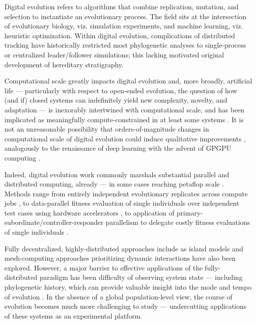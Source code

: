 Digital evolution refers to algorithms that combine replication, mutation, and selection to instantiate an evolutionary process.
The field sits at the intersection of evolutionary biology, viz. simulation experiments, and machine learning, viz. heuristic optimization.
Within digital evolution, complications of distributed tracking have historically restricted most phylogenetic analyses to single-process or centralized leader/follower simulations; this lacking motivated original development of hereditary stratigraphy.

Computational scale greatly impacts digital evolution and, more broadly, artificial life \citep{ackley2014indefinitely} --- particularly with respect to open-ended evolution, the question of how (and if) closed systems can indefinitely yield new complexity, novelty, and adaptation --- is inexorably intertwined with computational scale, and has been implicated as meaningfully compute-constrained in at least some systems \citep{taylor2016open,channon2019maximum}.
It is not an unreasonable possibility that orders-of-magnitude changes in computational scale of digital evolution could induce qualitative improvements \citep{moreno2022engineering}, analogously to the renaissance of deep learning with the advent of GPGPU computing \citep{krizhevsky2012imagenet}.

Indeed, digital evolution work commonly marshals substantial parallel and distributed computing, already  --- in some cases reaching petaflop scale \citep{gilbert2015artificial}.
Methods range from entirely independent evolutionary replicates across compute jobs \citep{dolson2017spatial, hornby2006automated}, to data-parallel fitness evaluation of single individuals over independent test cases using hardware accelerators \citep{harding2007fast_springer, langdon2019continuous}, to application of primary-subordinate/controller-responder parallelism to delegate costly fitness evaluations of single individuals \citep{cantu2001master,miikkulainen2019evolving}.

Fully decentralized, highly-distributed approaches include as island models \citep{bennett1999building,schulte2010genetic} and mesh-computing approaches prioritizing dynamic interactions \citep{ray1995proposal,ackley2018digital,moreno2021conduit} have also been explored.
However, a major barrier to effective applications of the fully-distributed paradigm has been difficulty of observing system state --- including phylogenetic history, which can provide valuable insight into the mode and tempo of evolution \citep{dolson2020interpreting}.
In the absence of a global population-level view, the course of evolution becomes much more challenging to study --- undercutting applications of these systems as an experimental platform.

